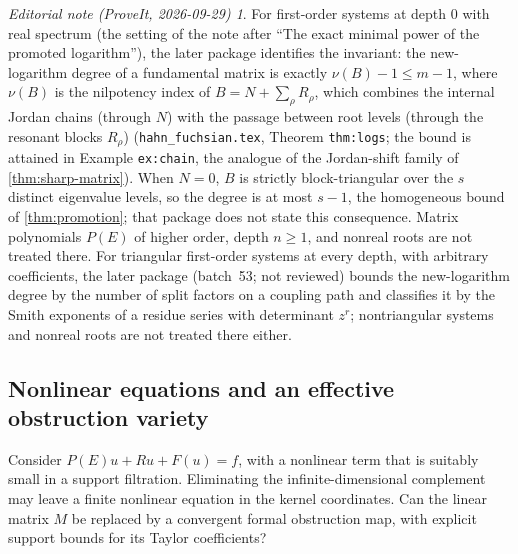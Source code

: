 \documentclass[11pt,a4paper]{article}
\numberwithin{equation}{section}
\theoremstyle{definition}
\theoremstyle{remark}
\newtheorem*{ednote}{Editorial note (ProveIt, 2026-09-29)}
\begin{document}
\begin{ednote}\label{ed:matrix-systems}
For first-order systems at depth $0$ with real spectrum (the setting of the note after ``The exact minimal power of the promoted logarithm''), the later package  identifies the invariant: the new-logarithm degree of a fundamental matrix is exactly $\nu(B)-1\le m-1$, where $\nu(B)$ is the nilpotency index of $B=N+\sum_\rho R_\rho$, which combines the internal Jordan chains (through $N$) with the passage between root levels (through the resonant blocks $R_\rho$) (\texttt{hahn\_fuchsian.tex}, Theorem \texttt{thm:logs}; the bound is attained in Example \texttt{ex:chain}, the analogue of the Jordan-shift family of \cref{thm:sharp-matrix}). When $N=0$, $B$ is strictly block-triangular over the $s$ distinct eigenvalue levels, so the degree is at most $s-1$, the homogeneous bound of \cref{thm:promotion}; that package does not state this consequence. Matrix polynomials $P(E)$ of higher order, depth $n\ge1$, and nonreal roots are not treated there.
For triangular first-order systems at every depth, with arbitrary coefficients, the later package  (batch~53; not reviewed) bounds the new-logarithm degree by the number of split factors on a coupling path and classifies it by the Smith exponents of a residue series with determinant $z^r$; nontriangular systems and nonreal roots are not treated there either.
\end{ednote}

\subsection{Nonlinear equations and an effective obstruction variety}
Consider $P(E)u+Ru+F(u)=f$, with a nonlinear term that is suitably small in a support filtration. Eliminating the infinite-dimensional complement may leave a finite nonlinear equation in the kernel coordinates. Can the linear matrix $M$ be replaced by a convergent formal obstruction map, with explicit support bounds for its Taylor coefficients?
\end{document}
